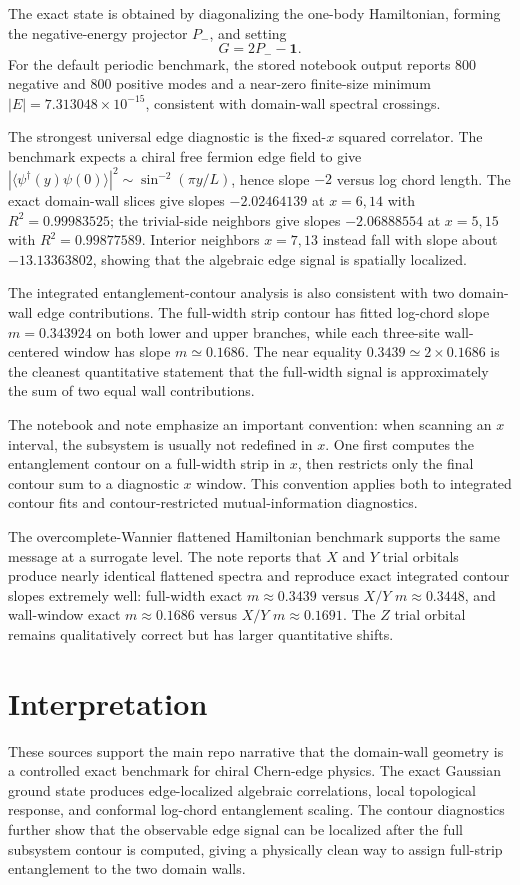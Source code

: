 \documentclass[aps,prb,onecolumn,nofootinbib,superscriptaddress]{revtex4-2}
\begin{document}
The exact state is obtained by diagonalizing the one-body Hamiltonian, forming
the negative-energy projector $P_-$, and setting
\begin{equation}
G=2P_- - \mathbf{1}.
\end{equation}
For the default periodic benchmark, the stored notebook output reports
$800$ negative and $800$ positive modes and a near-zero finite-size minimum
$|E|=7.313048\times 10^{-15}$, consistent with domain-wall spectral crossings.

The strongest universal edge diagnostic is the fixed-$x$ squared correlator.
The benchmark expects a chiral free fermion edge field to give
$|\langle \psi^\dagger(y)\psi(0)\rangle|^2\sim
\sin^{-2}(\pi y/L)$, hence slope $-2$ versus log chord length.  The exact
domain-wall slices give slopes $-2.02464139$ at $x=6,14$ with
$R^2=0.99983525$; the trivial-side neighbors give slopes $-2.06888554$ at
$x=5,15$ with $R^2=0.99877589$.  Interior neighbors $x=7,13$ instead fall with
slope about $-13.13363802$, showing that the algebraic edge signal is spatially
localized.

The integrated entanglement-contour analysis is also consistent with two
domain-wall edge contributions.  The full-width strip contour has fitted
log-chord slope $m=0.343924$ on both lower and upper branches, while each
three-site wall-centered window has slope $m\simeq 0.1686$.  The near equality
$0.3439 \simeq 2\times 0.1686$ is the cleanest quantitative statement that the
full-width signal is approximately the sum of two equal wall contributions.

The notebook and note emphasize an important convention: when scanning an
$x$ interval, the subsystem is usually not redefined in $x$.  One first computes
the entanglement contour on a full-width strip in $x$, then restricts only the
final contour sum to a diagnostic $x$ window.  This convention applies both to
integrated contour fits and contour-restricted mutual-information diagnostics.

The overcomplete-Wannier flattened Hamiltonian benchmark supports the same
message at a surrogate level.  The note reports that $X$ and $Y$ trial orbitals
produce nearly identical flattened spectra and reproduce exact integrated
contour slopes extremely well: full-width exact $m\approx 0.3439$ versus
$X/Y$ $m\approx 0.3448$, and wall-window exact $m\approx 0.1686$ versus
$X/Y$ $m\approx 0.1691$.  The $Z$ trial orbital remains qualitatively correct
but has larger quantitative shifts.

\section{Interpretation}
These sources support the main repo narrative that the domain-wall geometry is
a controlled exact benchmark for chiral Chern-edge physics.  The exact
Gaussian ground state produces edge-localized algebraic correlations, local
topological response, and conformal log-chord entanglement scaling.  The
contour diagnostics further show that the observable edge signal can be
localized after the full subsystem contour is computed, giving a physically
clean way to assign full-strip entanglement to the two domain walls.
\end{document}
